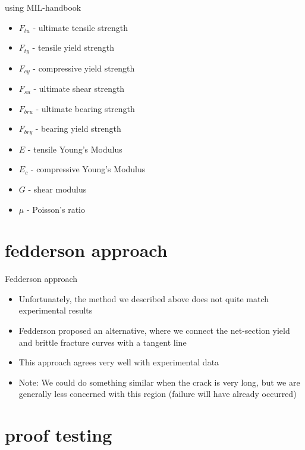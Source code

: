 \documentclass[10pt]{beamer}
\begin{document}
\begin{frame}{using MIL-handbook}
	\begin{itemize}
		\item $F_{tu}$ - ultimate tensile strength
		\item $F_{ty}$ - tensile yield strength
		\item $F_{cy}$ - compressive yield strength
		\item $F_{su}$ - ultimate shear strength
		\item $F_{bru}$ - ultimate bearing strength
		\item $F_{bry}$ - bearing yield strength
		\item $E$ - tensile Young's Modulus
		\item $E_c$ - compressive Young's Modulus
		\item $G$ - shear modulus
		\item $\mu$ - Poisson's ratio
	\end{itemize}
\end{frame}

\section{fedderson approach}

\begin{frame}{Fedderson approach}
	\begin{itemize}[<+->]
		\item Unfortunately, the method we described above does not quite match experimental results
		\item Fedderson proposed an alternative, where we connect the net-section yield and brittle fracture curves with a tangent line
		\item This approach agrees very well with experimental data
		\item Note: We could do something similar when the crack is very long, but we are generally less concerned with this region (failure will have already occurred)
	\end{itemize}
\end{frame}

\section{proof testing}
\end{document}
